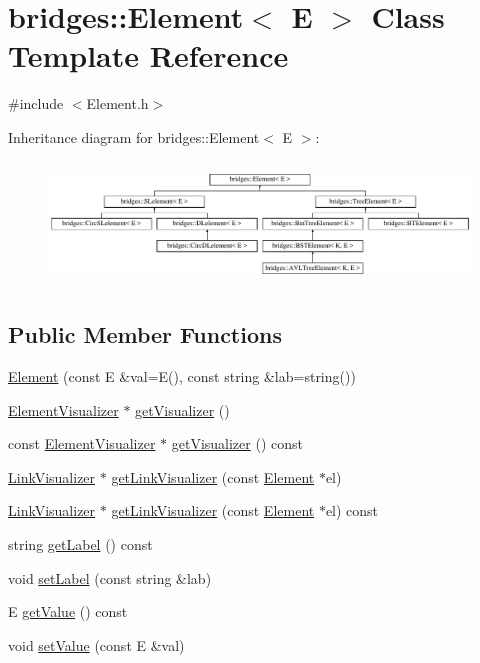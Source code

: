 \hypertarget{classbridges_1_1_element}{}\section{bridges\+:\+:Element$<$ E $>$ Class Template Reference}
\label{classbridges_1_1_element}


{\ttfamily \#include $<$Element.\+h$>$}

Inheritance diagram for bridges\+:\+:Element$<$ E $>$\+:\begin{figure}[H]
\begin{center}
\leavevmode
\includegraphics[height=3.301887cm]{classbridges_1_1_element}
\end{center}
\end{figure}
\subsection*{Public Member Functions}
\begin{DoxyCompactItemize}
\item 
\hyperlink{classbridges_1_1_element_abc7131584142ea48faf3b7a8033d1fef}{Element} (const E \&val=E(), const string \&lab=string())
\item 
\hyperlink{classbridges_1_1_element_visualizer}{Element\+Visualizer} $\ast$ \hyperlink{classbridges_1_1_element_a358f350ae6e33d55c4ac9f9213d0c5bc}{get\+Visualizer} ()
\item 
const \hyperlink{classbridges_1_1_element_visualizer}{Element\+Visualizer} $\ast$ \hyperlink{classbridges_1_1_element_a27d023054130e17234ace34ba35e766e}{get\+Visualizer} () const
\item 
\hyperlink{classbridges_1_1_link_visualizer}{Link\+Visualizer} $\ast$ \hyperlink{classbridges_1_1_element_aa8dd91d04c22c697f7c500a18642282f}{get\+Link\+Visualizer} (const \hyperlink{classbridges_1_1_element}{Element} $\ast$el)
\item 
\hyperlink{classbridges_1_1_link_visualizer}{Link\+Visualizer} $\ast$ \hyperlink{classbridges_1_1_element_a202553f482b9a49057c8c87a368cc93a}{get\+Link\+Visualizer} (const \hyperlink{classbridges_1_1_element}{Element} $\ast$el) const
\item 
string \hyperlink{classbridges_1_1_element_a38df6d5f1e0203dfa85b073b6756194e}{get\+Label} () const
\item 
void \hyperlink{classbridges_1_1_element_a22313b74452175d07650168a701daa99}{set\+Label} (const string \&lab)
\item 
E \hyperlink{classbridges_1_1_element_a7df53b8b248020e9536bb951c725c7ba}{get\+Value} () const
\item 
void \hyperlink{classbridges_1_1_element_a737cb19281b6aa45a5a1dc9d592dad93}{set\+Value} (const E \&val)
\end{DoxyCompactItemize}
